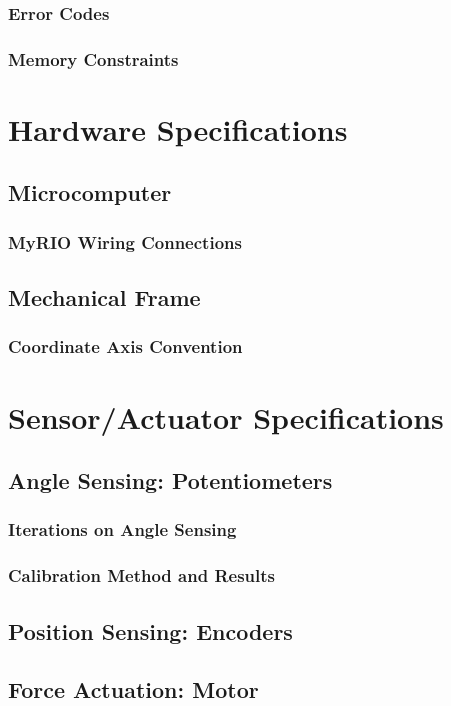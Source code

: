 \documentclass[letterpaper]{article}
\begin{document}
\subsubsection{Error Codes}
\subsubsection{Memory Constraints}

\newpage
\section{Hardware Specifications}
\subsection{Microcomputer}
\subsubsection{MyRIO Wiring Connections}
\subsection{Mechanical Frame}
\subsubsection{Coordinate Axis Convention}

\section{Sensor/Actuator Specifications}
\subsection{Angle Sensing: Potentiometers}
\subsubsection{Iterations on Angle Sensing}
\subsubsection{Calibration Method and Results}
\subsection{Position Sensing: Encoders}
\subsection{Force Actuation: Motor}
\end{document}
